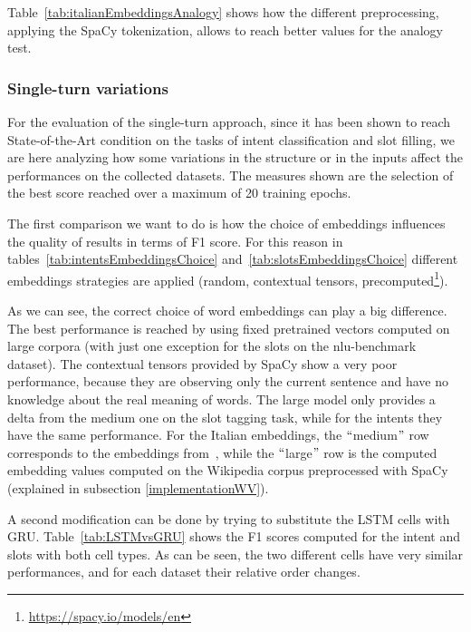 

Table~\ref{tab:italianEmbeddingsAnalogy} shows how the different preprocessing, applying the SpaCy tokenization, allows to reach better values for the analogy test.

\subsubsection{Single-turn variations}
For the evaluation of the single-turn approach, since it has been shown to reach State-of-the-Art condition on the tasks of intent classification and slot filling, we are here analyzing how some variations in the structure or in the inputs affect the performances on the collected datasets. The measures shown are the selection of the best score reached over a maximum of 20 training epochs.

The first comparison we want to do is how the choice of embeddings influences the quality of results in terms of F1 score. For this reason in tables~\ref{tab:intentsEmbeddingsChoice} and~\ref{tab:slotsEmbeddingsChoice} different embeddings strategies are applied (random, contextual tensors, precomputed\footnote{\url{https://spacy.io/models/en}}).





As we can see, the correct choice of word embeddings can play a big difference. The best performance is reached by using fixed pretrained vectors computed on large corpora (with just one exception for the slots on the nlu-benchmark dataset). The contextual tensors provided by SpaCy show a very poor performance, because they are observing only the current sentence and have no knowledge about the real meaning of words. The large model only provides a delta from the medium one on the slot tagging task, while for the intents they have the same performance. For the Italian embeddings, the $``$medium$"$  row corresponds to the embeddings from~\cite{berardi2015word}, while the $``$large$"$  row is the computed embedding values computed on the Wikipedia corpus preprocessed with SpaCy (explained in subsection \ref{implementationWV}).

A second modification can be done by trying to substitute the LSTM cells with GRU. Table~\ref{tab:LSTMvsGRU} shows the F1 scores computed for the intent and slots with both cell types. As can be seen, the two different cells have very similar performances, and for each dataset their relative order changes.

